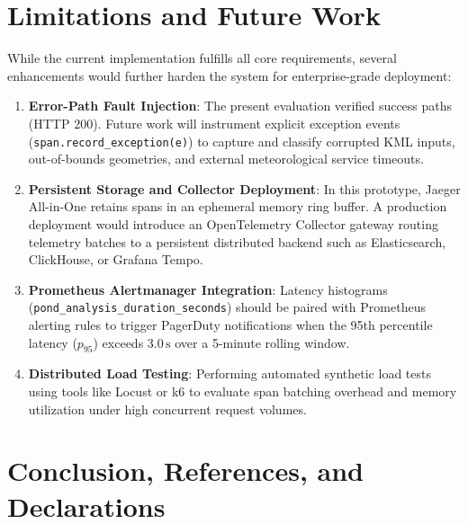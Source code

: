 \documentclass[11pt,a4paper]{article}
\begin{document}
\section{Limitations and Future Work}

While the current implementation fulfills all core requirements, several enhancements would further harden the system for enterprise-grade deployment:
\begin{enumerate}[leftmargin=*]
    \item \textbf{Error-Path Fault Injection}: The present evaluation verified success paths (HTTP 200). Future work will instrument explicit exception events (\texttt{span.record\_exception(e)}) to capture and classify corrupted KML inputs, out-of-bounds geometries, and external meteorological service timeouts.
    \item \textbf{Persistent Storage and Collector Deployment}: In this prototype, Jaeger All-in-One retains spans in an ephemeral memory ring buffer. A production deployment would introduce an OpenTelemetry Collector gateway routing telemetry batches to a persistent distributed backend such as Elasticsearch, ClickHouse, or Grafana Tempo.
    \item \textbf{Prometheus Alertmanager Integration}: Latency histograms (\texttt{pond\_analysis\_duration\_seconds}) should be paired with Prometheus alerting rules to trigger PagerDuty notifications when the 95th percentile latency ($p_{95}$) exceeds $3.0\,\text{s}$ over a 5-minute rolling window.
    \item \textbf{Distributed Load Testing}: Performing automated synthetic load tests using tools like Locust or k6 to evaluate span batching overhead and memory utilization under high concurrent request volumes.
\end{enumerate}

\section{Conclusion, References, and Declarations}
\end{document}
